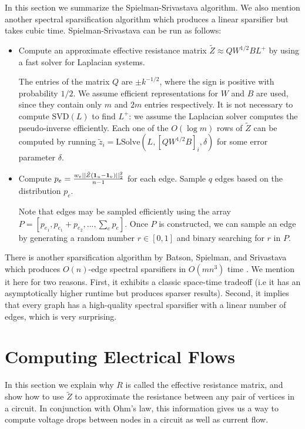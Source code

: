 \documentclass{article}
\begin{document}
In this section we summarize the Spielman-Srivastava algorithm. We also
mention another spectral sparsification algorithm which produces a linear
sparsifier but takes cubic time. Spielman-Srivastava can be run as follows:
\begin{itemize}
    \item Compute an approximate effective resistance matrix $\tilde{Z}
        \approx QW^{1/2}BL^+$ by using a fast solver for Laplacian systems.

        The entries of the matrix $Q$ are $\pm k^{-1/2}$, where the sign is
        positive with probability $1/2$. We assume efficient representations
        for $W$ and $B$ are used, since they contain only $m$ and $2m$
        entries respectively. It is not necessary to compute $\text{SVD}(L)$
        to find $L^+$: we assume the Laplacian solver computes the
        pseudo-inverse efficiently. Each one of the $O(\log m)$ rows of
        $\tilde{Z}$ can be computed by running $\tilde{z}_i =
        \text{LSolve}(L, [QW^{1/2}B]_i, \delta)$ for some error parameter
        $\delta$.

    \item Compute $p_e = \frac{w_e||\tilde{Z}(\mathbf{1}_u -
        \mathbf{1}_v)||^2_2}{n-1}$ for each edge. Sample $q$ edges based on the
        distribution $p_e$.

        Note that edges may be sampled efficiently using the array $P =
        [p_{e_1}, p_{e_1} + p_{e_2}, ..., \sum_e p_e]$. Once $P$ is
        constructed, we can sample an edge by generating a random number $r
        \in [0,1]$ and binary searching for $r$ in $P$. 
\end{itemize}
There is another sparsification algorithm by Batson, Spielman, and
Srivastava which produces $O(n)$-edge spectral sparsifiers in $O(mn^3)$ time
\cite{BatsonSpielmanSrivastava}. We mention it here for two reasons.  First,
it exhibits a classic space-time tradeoff (i.e it has an asymptotically
higher runtime but produces sparser results). Second, it implies that every
graph has a high-quality spectral sparsifier with a linear number of edges,
which is very surprising.

\section{Computing Electrical Flows}

In this section we explain why $R$ is called the effective resistance
matrix, and show how to use $\tilde{Z}$ to approximate the resistance
between any pair of vertices in a circuit. In conjunction with Ohm's law,
this information gives us a way to compute voltage drops between nodes in a
circuit as well as current flow.
\end{document}
